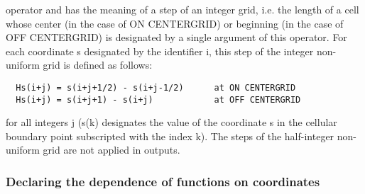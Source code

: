 operator and has the  meaning of  a step  of an  integer grid,  i.e. the
length  of  a  cell  whose  center  (in  the  case  of ON CENTERGRID) or
beginning (in the case of OFF  CENTERGRID)  is  designated  by  a single
argument  of  this  operator.  For  each  coordinate s designated by the
identifier i, this step of the  integer non-uniform  grid is  defined as
follows:
\begin{verbatim}
  Hs(i+j) = s(i+j+1/2) - s(i+j-1/2)      at ON CENTERGRID
  Hs(i+j) = s(i+j+1) - s(i+j)            at OFF CENTERGRID
\end{verbatim}
for all integers j (s(k) designates the value of the coordinate s in the
cellular boundary point subscripted with the index k). The steps  of the
half-integer non-uniform grid are not applied in outputs.


\subsubsection{Declaring the dependence of functions on coordinates}


